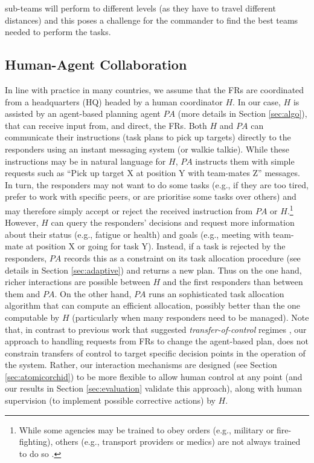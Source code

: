 sub-teams will perform to different levels (as they have to travel different distances) and this poses a challenge for the commander to find the best teams needed to perform the tasks.
%
\subsection{Human-Agent Collaboration}
\noindent In line with practice in many countries, we assume that the FRs are coordinated from a headquarters (HQ) headed by a human coordinator $H$. In our case, $H$ is assisted by an agent-based planning agent $PA$ (more details in Section \ref{sec:algo}), that can receive input from, and direct, the FRs.   Both  $H$ and $PA$  can communicate their  instructions (task plans to pick up targets) directly to the responders using an instant messaging system (or walkie talkie).  While these instructions may be in natural language for $H$, $PA$ instructs them with simple requests such as ``Pick up target X at position Y with team-mates Z'' messages. In turn, the responders may not want to do some tasks (e.g., if they are too tired, prefer to work with specific  peers, or are prioritise some tasks over others) and may therefore simply accept or reject the received instruction from $PA$ or $H$.\footnote{While some agencies may be trained to obey orders (e.g., military or fire-fighting), others (e.g., transport providers or medics) are not  always trained to do so \cite{harvard2010disaster}.} However, $H$ can query the responders' decisions and request  more information about their status (e.g., fatigue or health) and goals (e.g., meeting with team-mate at position X or going for task Y). Instead, if a task is rejected by the responders, $PA$ records this as a constraint on its task allocation procedure (see details in Section \ref{sec:adaptive}) and returns a new plan. Thus on the one hand, richer interactions are possible between $H$ and the first responders than between them and $PA$. On the other hand, $PA$ runs an sophisticated task allocation algorithm that can compute an efficient allocation, possibly better than the one computable by $H$ (particularly when many responders need to be managed). Note that, in contrast to previous work that suggested \emph{transfer-of-control} regimes \cite{scerri:etal:2005}, our approach to handling requests from FRs to change the agent-based plan, does not constrain transfers of control to target specific decision points in the operation of the system. Rather, our interaction mechanisms are designed (see Section \ref{sec:atomicorchid}) to be more flexible to allow human control at any point (and our results  in Section \ref{sec:evaluation} validate this approach), along with human supervision (to implement possible corrective actions) by $H$.


